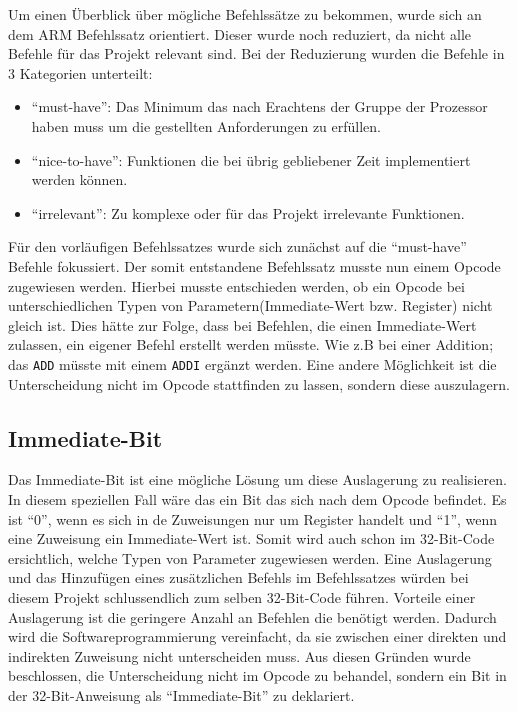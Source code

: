 \documentclass[paper=a4,fontsize=12pt,twocolumn]{scrreprt}
\begin{document}
Um einen Überblick über mögliche Befehlssätze zu bekommen, wurde sich an dem ARM Befehlssatz orientiert\footnotemark.
Dieser wurde noch reduziert, da nicht alle Befehle für das Projekt relevant sind.
Bei der Reduzierung wurden die Befehle in 3 Kategorien unterteilt:
\begin{itemize}
    \item \enquote{must-have}:
    Das Minimum das nach Erachtens der Gruppe der Prozessor haben muss um die gestellten Anforderungen zu erfüllen.
    \item \enquote{nice-to-have}:
    Funktionen die bei übrig gebliebener Zeit implementiert werden können.
    \item \enquote{irrelevant}:
    Zu komplexe oder für das Projekt irrelevante Funktionen.
\end{itemize}
Für den vorläufigen Befehlssatzes wurde sich zunächst auf die \enquote{must-have} Befehle fokussiert.
Der somit entstandene Befehlssatz musste nun einem Opcode zugewiesen werden.
Hierbei musste entschieden werden, ob ein Opcode bei unterschiedlichen Typen von Parametern(Immediate-Wert bzw. Register) nicht gleich ist.
Dies hätte zur Folge, dass bei Befehlen, die einen Immediate-Wert zulassen, ein eigener Befehl erstellt werden müsste.
Wie z.B bei einer Addition; das \texttt{ADD} müsste mit einem \texttt{ADDI} ergänzt werden.
Eine andere Möglichkeit ist die Unterscheidung nicht im Opcode stattfinden zu lassen, sondern diese auszulagern.

\subsection{Immediate-Bit}

Das Immediate-Bit ist eine mögliche Lösung um diese Auslagerung zu realisieren.
In diesem speziellen Fall wäre das ein Bit das sich nach dem Opcode befindet.
Es ist \enquote{0}, wenn es sich in de Zuweisungen nur um Register handelt und \enquote{1}, wenn eine Zuweisung ein Immediate-Wert ist.
Somit wird auch schon im 32-Bit-Code ersichtlich, welche Typen von Parameter zugewiesen werden.
Eine Auslagerung und das Hinzufügen eines zusätzlichen Befehls im Befehlssatzes würden bei diesem Projekt schlussendlich zum selben 32-Bit-Code führen.
Vorteile einer Auslagerung ist die geringere Anzahl an Befehlen die benötigt werden.
Dadurch wird die Softwareprogrammierung vereinfacht, da sie zwischen einer direkten und indirekten Zuweisung nicht unterscheiden muss.
Aus diesen Gründen wurde beschlossen, die Unterscheidung nicht im Opcode zu behandel, sondern ein Bit in der 32-Bit-Anweisung als \enquote{Immediate-Bit} zu deklariert.
\end{document}
